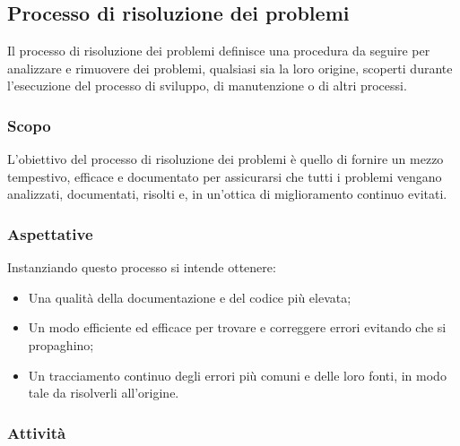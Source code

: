 \subsection{Processo di risoluzione dei problemi}

	Il processo di risoluzione dei problemi definisce una procedura da seguire per analizzare e rimuovere dei problemi, qualsiasi sia la loro origine, scoperti durante l'esecuzione del processo di sviluppo, di manutenzione o di altri processi.

	\subsubsection{Scopo}
		L'obiettivo del processo di risoluzione dei problemi è quello di fornire un mezzo tempestivo, efficace e documentato per assicurarsi che tutti i problemi vengano analizzati, documentati, risolti e, in un'ottica di miglioramento continuo evitati.

	\subsubsection{Aspettative}
		Instanziando questo processo si intende ottenere:
		\begin{itemize}
		 	\item Una qualità della documentazione e del codice più elevata;
		 	\item Un modo efficiente ed efficace per trovare e correggere errori evitando che si propaghino;
		 	\item Un tracciamento continuo degli errori più comuni e delle loro fonti, in modo tale da risolverli all'origine.
		 \end{itemize}
	\subsubsection{Attività}
